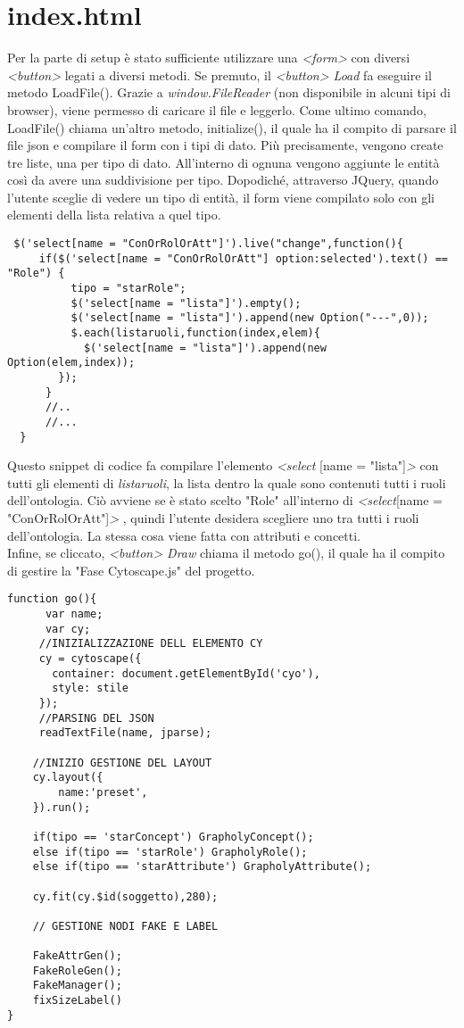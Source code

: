 \documentclass[Lau,binding=0.6cm]{sapthesis}
\begin{document}
\section{index.html}
Per la parte di setup è stato sufficiente utilizzare una \textit{<form>} con diversi \textit{<button>} legati a diversi metodi. Se premuto, il \textit{<button> Load} fa eseguire il metodo LoadFile(). Grazie a \textit{window.FileReader} (non disponibile in alcuni tipi di browser), viene permesso di caricare il file e leggerlo. Come ultimo comando, LoadFile() chiama un'altro metodo, initialize(), il quale ha il compito di parsare il file json e compilare il form con i tipi di dato. Più precisamente, vengono create tre liste, una per tipo di dato. All'interno di ognuna vengono aggiunte le entità così da avere una suddivisione per tipo. Dopodiché, attraverso JQuery, quando l'utente sceglie di vedere un tipo di entità, il form viene compilato solo con gli elementi della lista relativa a quel tipo. 
\begin{verbatim}
 $('select[name = "ConOrRolOrAtt"]').live("change",function(){
     if($('select[name = "ConOrRolOrAtt"] option:selected').text() == "Role") {
          tipo = "starRole";
          $('select[name = "lista"]').empty();
          $('select[name = "lista"]').append(new Option("---",0));
          $.each(listaruoli,function(index,elem){
          	$('select[name = "lista"]').append(new Option(elem,index));
     	});
      }
      //..
      //...
  }
\end{verbatim}
Questo snippet di codice fa compilare l'elemento \textit{<select} [name = "lista"]\textit{>} con tutti gli elementi di \textit{listaruoli}, la lista dentro la quale sono contenuti tutti i ruoli dell'ontologia. Ciò avviene se è stato scelto "Role" all'interno di \textit{<select}[name = "ConOrRolOrAtt"]\textit{>} , quindi l'utente desidera scegliere uno tra tutti i ruoli dell'ontologia. La stessa cosa viene fatta con attributi e concetti.
\\Infine, se cliccato, \textit{<button> Draw} chiama il metodo go(), il quale ha il compito di gestire la "Fase Cytoscape.js" del progetto.
\begin{verbatim}
function go(){
      var name;
      var cy;
     //INIZIALIZZAZIONE DELL ELEMENTO CY 
     cy = cytoscape({
       container: document.getElementById('cyo'),
       style: stile
     });
     //PARSING DEL JSON
     readTextFile(name, jparse);
            
    //INIZIO GESTIONE DEL LAYOUT         
    cy.layout({
        name:'preset',
    }).run(); 
            
    if(tipo == 'starConcept') GrapholyConcept();
    else if(tipo == 'starRole') GrapholyRole();
    else if(tipo == 'starAttribute') GrapholyAttribute();

    cy.fit(cy.$id(soggetto),280);

    // GESTIONE NODI FAKE E LABEL

    FakeAttrGen();
    FakeRoleGen();
    FakeManager();
    fixSizeLabel()
}
\end{verbatim}
\end{document}
